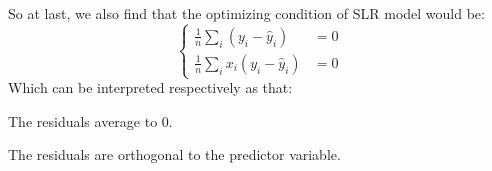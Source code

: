 So at last, we also find that the optimizing condition of SLR model would be:
\[
    \begin{cases}
        \frac{1}{n} \sum_i (y_i - \hat{y}_i) &= 0 \\
        \frac{1}{n} \sum_i x_i(y_i - \hat{y}_i) &= 0
    \end{cases}
\]
Which can be interpreted respectively as that:
\begin{bindenum}
    \item The residuals average to 0.
    \item The residuals are orthogonal to the predictor variable.
\end{bindenum}
